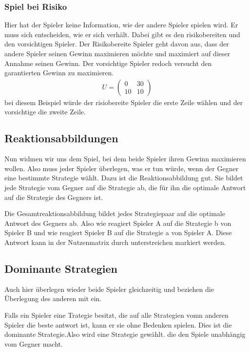 \documentclass[]{article}
\begin{document}
\subsubsection{Spiel bei Risiko}
Hier hat der Spieler keine Information, wie der andere Spieler spielen wird. Er muss sich entscheiden, wie er sich verhält. Dabei gibt es den risikobereiten und den vorsichtigen Spieler. Der Risikobereite Spieler geht davon aus, dass der andere Spieler seinen Gewinn maximieren möchte und maximiert auf dieser Annahme seinen Gewinn. Der vorsichtige Spieler redoch versucht den garantierten Gewinn zu maximieren. 
\begin{align*}
	U=\begin{pmatrix}
	0 & 30 \\ 10 & 10
	\end{pmatrix}
\end{align*}
bei diesem Beispiel würde der risiobereite Spieler die erste Zeile wählen und der vorsichtige die zweite Zeile. 

\subsection{Reaktionsabbildungen}
Nun widmen wir uns dem Spiel, bei dem beide Spieler ihren Gewinn maximieren wollen. Also muss jeder Spieler überlegen, was er tun würde, wenn der Gegner eine bestimmte Strategie wählt. Dazu ist die Reaktionsabbildung gut. Sie bildet jede Strategie vom Gegner auf die Strategie ab, die für ihn die  optimale Antwort auf die Strategie des Gegners ist. 

Die Gesamtreaktionsabbildung bildet jedes Strategiepaar auf die optimale Antwort des Gegners ab. Also wie reagiert Spieler A auf die Strategie b von Spieler B und wie reagiert Spieler B auf die Strategie a von Spieler A. Diese Antwort kann in der Nutzenmatrix durch unterstreichen markiert werden.

\subsection{Dominante Strategien}
Auch hier überlegen wieder beide Spieler gleichzeitig und beziehen die Überlegung des anderen mit ein.

Falls ein Spieler eine Trategie besitzt, die auf alle Strategien vomn anderen Spieler die beste antwort ist, kann er sie ohne Bedenken spielen. Dies ist die dominante Strategie.Also wird eine Strategie gewählt. die den Spiele unabhängig vom Gegner macht. 
\end{document}
